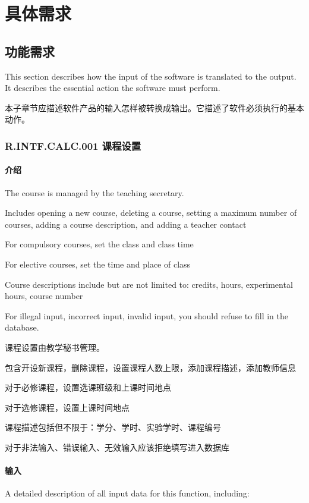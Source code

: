 \chapter{具体需求}
\section{功能需求}
This section describes how the input of the software is translated to the output. It describes the essential action the software must perform.

本子章节应描述软件产品的输入怎样被转换成输出。它描述了软件必须执行的基本动作。 

\subsection{R.INTF.CALC.001 课程设置}
\subsubsection{介绍}

The course is managed by the teaching secretary.

Includes opening a new course, deleting a course, setting a maximum number of courses, adding a course description, and adding a teacher contact

For compulsory courses, set the class and class time

For elective courses, set the time and place of class

Course descriptions include but are not limited to: credits, hours, experimental hours, course number

For illegal input, incorrect input, invalid input, you should refuse to fill in the database.

课程设置由教学秘书管理。

包含开设新课程，删除课程，设置课程人数上限，添加课程描述，添加教师信息

对于必修课程，设置选课班级和上课时间地点

对于选修课程，设置上课时间地点

课程描述包括但不限于：学分、学时、实验学时、课程编号

对于非法输入、错误输入、无效输入应该拒绝填写进入数据库


\subsubsection{输入}
A detailed description of all input data for this function, including:

